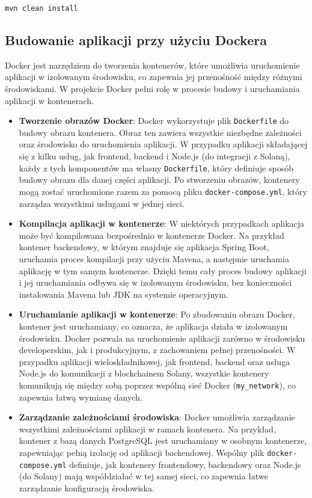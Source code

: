 \begin{verbatim}
mvn clean install
\end{verbatim}

\subsection{Budowanie aplikacji przy użyciu Dockera}

Docker jest narzędziem do tworzenia kontenerów, które umożliwia uruchomienie aplikacji w izolowanym środowisku, co zapewnia jej przenośność między różnymi środowiskami. W projekcie Docker pełni rolę w procesie budowy i uruchamiania aplikacji w kontenerach.

\begin{itemize}
    \item \textbf{Tworzenie obrazów Docker}: Docker wykorzystuje plik \texttt{Dockerfile} do budowy obrazu kontenera. Obraz ten zawiera wszystkie niezbędne zależności oraz środowisko do uruchomienia aplikacji. W przypadku aplikacji składającej się z kilku usług, jak frontend, backend i Node.js (do integracji z Solaną), każdy z tych komponentów ma własny \texttt{Dockerfile}, który definiuje sposób budowy obrazu dla danej części aplikacji. Po stworzeniu obrazów, kontenery mogą zostać uruchomione razem za pomocą pliku \texttt{docker-compose.yml}, który zarządza wszystkimi usługami w jednej sieci.
    
    \item \textbf{Kompilacja aplikacji w kontenerze}: W niektórych przypadkach aplikacja może być kompilowana bezpośrednio w kontenerze Docker. Na przykład kontener backendowy, w którym znajduje się aplikacja Spring Boot, uruchamia proces kompilacji przy użyciu Mavena, a następnie uruchamia aplikację w tym samym kontenerze. Dzięki temu cały proces budowy aplikacji i jej uruchamiania odbywa się w izolowanym środowisku, bez konieczności instalowania Mavena lub JDK na systemie operacyjnym.
    
    \item \textbf{Uruchamianie aplikacji w kontenerze}: Po zbudowaniu obrazu Docker, kontener jest uruchamiany, co oznacza, że aplikacja działa w izolowanym środowisku. Docker pozwala na uruchomienie aplikacji zarówno w środowisku developerskim, jak i produkcyjnym, z zachowaniem pełnej przenośności. W przypadku aplikacji wieloskładnikowej, jak frontend, backend oraz usługa Node.js do komunikacji z blockchainem Solany, wszystkie kontenery komunikują się między sobą poprzez wspólną sieć Docker (\texttt{my\_network}), co zapewnia łatwą wymianę danych.
    
    \item \textbf{Zarządzanie zależnościami środowiska}: Docker umożliwia zarządzanie wszystkimi zależnościami aplikacji w ramach kontenera. Na przykład, kontener z bazą danych PostgreSQL jest uruchamiany w osobnym kontenerze, zapewniając pełną izolację od aplikacji backendowej. Wspólny plik \texttt{docker-compose.yml} definiuje, jak kontenery frontendowy, backendowy oraz Node.js (do Solany) mają współdziałać w tej samej sieci, co zapewnia łatwe zarządzanie konfiguracją środowiska.
\end{itemize}


